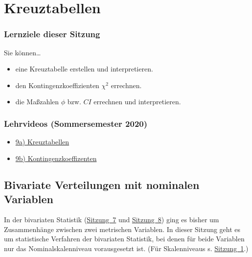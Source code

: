 \documentclass[
  11pt,
  ngerman,
  a4paper,
]{report}
\providecommand{\tightlist}{%
  \setlength{\itemsep}{0pt}\setlength{\parskip}{0pt}}
\begin{document}
\hypertarget{kreuztabellen}{%
\chapter{Kreuztabellen}\label{kreuztabellen}}

\hypertarget{lernziele-dieser-sitzung-8}{%
\subsection*{Lernziele dieser Sitzung}\label{lernziele-dieser-sitzung-8}}

Sie können\ldots{}

\begin{itemize}
\tightlist
\item
  eine Kreuztabelle erstellen und interpretieren.
\item
  den Kontingenzkoeffizienten \(\chi^2\) errechnen.
\item
  die Maßzahlen \(\phi\) bzw. \(\mathit{CI}\) errechnen und interpretieren.
\end{itemize}

\hypertarget{lehrvideos-sommersemester-2020-5}{%
\subsection*{Lehrvideos (Sommersemester 2020)}\label{lehrvideos-sommersemester-2020-5}}

\begin{itemize}
\tightlist
\item
  \href{https://video01.uni-frankfurt.de/Mediasite/Play/24a54089cd474c5f936a2dfeecfc43281d}{9a) Kreuztabellen}
\item
  \href{https://video01.uni-frankfurt.de/Mediasite/Play/007a5399d62a4e27a09e1e31e9b04e461d}{9b) Kontingenzkoeffizenten}
\end{itemize}

\hypertarget{bivariate-verteilungen-mit-nominalen-variablen}{%
\section{Bivariate Verteilungen mit nominalen Variablen}\label{bivariate-verteilungen-mit-nominalen-variablen}}

In der bivariaten Statistik (\protect\hyperlink{korrelation}{Sitzung~7} und \protect\hyperlink{lineare-regression}{Sitzung~8}) ging es bisher um Zusammenhänge zwischen zwei metrischen Variablen. In dieser Sitzung geht es um statistische Verfahren der bivariaten Statistik, bei denen für beide Variablen nur das Nominalskalenniveau vorausgesetzt ist. (Für Skalenniveaus s. \protect\hyperlink{skalenniveaus}{Sitzung~1}.)
\end{document}
